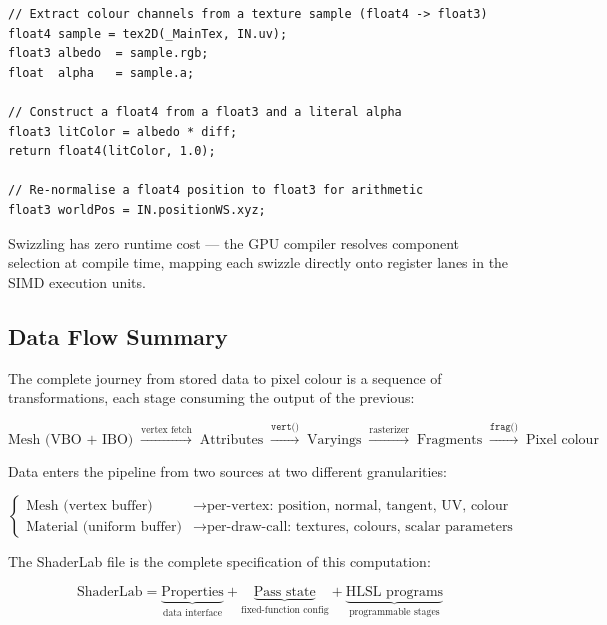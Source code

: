 \documentclass[11pt]{article}
\begin{document}
\begin{lstlisting}
// Extract colour channels from a texture sample (float4 -> float3)
float4 sample = tex2D(_MainTex, IN.uv);
float3 albedo  = sample.rgb;
float  alpha   = sample.a;

// Construct a float4 from a float3 and a literal alpha
float3 litColor = albedo * diff;
return float4(litColor, 1.0);

// Re-normalise a float4 position to float3 for arithmetic
float3 worldPos = IN.positionWS.xyz;
\end{lstlisting}

Swizzling has zero runtime cost — the GPU compiler resolves component selection at compile time, mapping each swizzle directly onto register lanes in the SIMD execution units.


\subsection{Data Flow Summary}

The complete journey from stored data to pixel colour is a sequence of transformations, each stage consuming the output of the previous:

\begin{equation}
    \text{Mesh (VBO + IBO)}
    \;\xrightarrow{\text{vertex fetch}}\;
    \text{Attributes}
    \;\xrightarrow{\texttt{vert()}}\;
    \text{Varyings}
    \;\xrightarrow{\text{rasterizer}}\;
    \text{Fragments}
    \;\xrightarrow{\texttt{frag()}}\;
    \text{Pixel colour}
\end{equation}

Data enters the pipeline from two sources at two different granularities:

\begin{equation}
    \begin{cases}
        \text{Mesh (vertex buffer)} & \rightarrow \text{per-vertex: position, normal, tangent, UV, colour} \\
        \text{Material (uniform buffer)} & \rightarrow \text{per-draw-call: textures, colours, scalar parameters}
    \end{cases}
\end{equation}

The ShaderLab file is the complete specification of this computation:

\begin{equation}
    \text{ShaderLab} =
    \underbrace{\text{Properties}}_{\text{data interface}}
    +
    \underbrace{\text{Pass state}}_{\text{fixed-function config}}
    +
    \underbrace{\text{HLSL programs}}_{\text{programmable stages}}
\end{equation}
\end{document}
